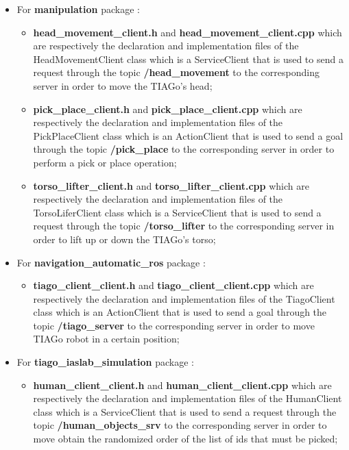\begin{itemize}
\begin{itemize}
    \end{itemize}
    \item For \textbf{manipulation} package :
    \begin{itemize}
        \item \textbf{head\_movement\_client.h} and \textbf{head\_movement\_client.cpp} which are respectively the declaration and implementation files of the HeadMovementClient class which is a ServiceClient that is used to send a request through the topic \textbf{/head\_movement} to the corresponding server in order to move the TIAGo's head;
        \item \textbf{pick\_place\_client.h} and \textbf{pick\_place\_client.cpp} which are respectively the declaration and implementation files of the PickPlaceClient class which is an ActionClient that is used to send a goal through the topic \textbf{/pick\_place} to the corresponding server in order to perform a pick or place operation;
        \item \textbf{torso\_lifter\_client.h} and \textbf{torso\_lifter\_client.cpp}  which are respectively the declaration and implementation files of the TorsoLiferClient class which is a ServiceClient that is used to send a request through the topic \textbf{/torso\_lifter} to the corresponding server in order to lift up or down the TIAGo's torso;
    \end{itemize}
    \item For \textbf{navigation\_automatic\_ros} package :
    \begin{itemize}
        \item \textbf{tiago\_client\_client.h} and \textbf{tiago\_client\_client.cpp} which are respectively the declaration and implementation files of the TiagoClient class which is an ActionClient that is used to send a goal through the topic \textbf{/tiago\_server} to the corresponding server in order to move TIAGo robot in a certain position;
    \end{itemize}
    \item For \textbf{tiago\_iaslab\_simulation} package :    
    \begin{itemize}
        \item \textbf{human\_client\_client.h} and \textbf{human\_client\_client.cpp} which are respectively the declaration and implementation files of the HumanClient class which is a ServiceClient that is used to send a request through the topic \textbf{/human\_objects\_srv} to the corresponding server in order to move obtain the randomized order of the list of ids that must be picked;
    \end{itemize}
\end{itemize}
